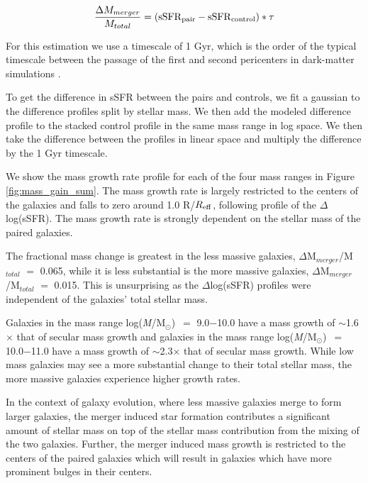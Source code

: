 \documentclass[iop,revtex4,twocolumn,apj,numberedappendix,appendixfloats]{emulateapj}
\newcommand{\reff}{$R_{\rm eff}$}
\newcommand{\logm}{log({\it M}/M$_{\odot}$)}
\begin{document}
\begin{equation}
\frac{\Delta M_{merger}}{M_{total}} = \left({\rm sSFR}_{\rm pair} - {\rm sSFR}_{\rm control}\right) * \tau
\end{equation}

For this estimation we use a timescale of 1 Gyr, which is the order of the typical timescale between the passage of the first and second pericenters in dark-matter simulations \citep{Boylan-Kolchin:2008}. 

To get the difference in sSFR between the pairs and controls, we fit a gaussian to the difference profiles split by stellar mass. We then add the modeled difference profile to the stacked control profile in the same mass range in log space. We then take the difference between the profiles in linear space and multiply the difference by the 1 Gyr timescale. 

We show the mass growth rate profile for each of the four mass ranges in Figure \ref{fig:mass_gain_sum}. The mass growth rate is largely restricted to the centers of the galaxies and falls to zero around 1.0 R/\reff, following profile of the $\Delta$log(sSFR). The mass growth rate is strongly dependent on the stellar mass of the paired galaxies. 

The fractional mass change is greatest in the less massive galaxies, $\Delta$M$_{merger}$/M$_{total}$ $=$ 0.065, while it is less substantial is the more massive galaxies, $\Delta$M$_{merger}$/M$_{total}$ $=$ 0.015. This is unsurprising as the $\Delta$log(sSFR) profiles were independent of the galaxies' total stellar mass. 

Galaxies in the mass range \logm\ $=$ 9.0$-$10.0 have a mass growth of $\sim$1.6$\times$ that of secular mass growth and galaxies in the mass range \logm\ $=$ 10.0$-$11.0 have a mass growth of $\sim$2.3$\times$ that of secular mass growth. While low mass galaxies may see a more substantial change to their total stellar mass, the more massive galaxies experience higher growth rates.

In the context of galaxy evolution, where less massive galaxies merge to form larger galaxies, the merger induced star formation contributes a significant amount of stellar mass on top of the stellar mass contribution from the mixing of the two galaxies. Further, the merger induced mass growth is restricted to the centers of the paired galaxies which will result in galaxies which have more prominent bulges in their centers.  

\end{document}
